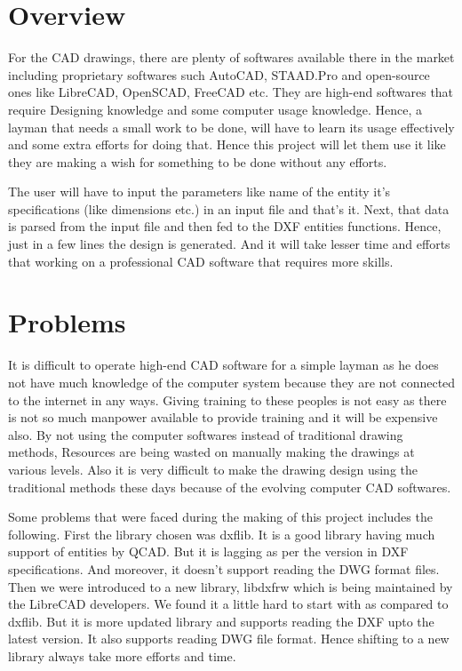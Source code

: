 \section{Overview}
For the CAD drawings, there are plenty of softwares available there in the market including proprietary softwares such AutoCAD, STAAD.Pro and open-source ones like LibreCAD, OpenSCAD, FreeCAD etc. They are high-end softwares that require Designing knowledge and some computer usage knowledge. Hence, a layman that needs a small work to be done, will have to learn its usage effectively and some extra efforts for doing that. Hence this project will let them use it like they are making a wish for something to be done without any efforts.


The user will have to input the parameters like name of the entity it's specifications (like dimensions etc.) in an input file and that's it. Next, that data is parsed from the input file and then fed to the DXF entities functions. Hence, just in a few lines the design is generated. And it will take lesser time and efforts that working on a professional CAD software that requires more skills.



\section{Problems}
It is difficult to operate high-end CAD software for a simple layman as he does not have  much knowledge of the computer system because they are not connected to the internet in any ways. Giving training to these peoples is not easy as there is not so much manpower available to provide training and it will be expensive also. By not using the computer softwares instead of traditional drawing methods, Resources are being wasted 
on manually making the drawings at various levels.
Also it is very difficult to make the drawing design using the traditional methods these days because of the evolving computer CAD softwares.

Some problems that were faced during the making of this project includes the following. First the library chosen was dxflib. It is a good library having much support of entities by QCAD. But it is lagging as per the version in DXF specifications. And moreover, it doesn't support reading the DWG format files. Then we were introduced to a new library, libdxfrw which is being maintained by the LibreCAD developers. We found it a little hard to start with as compared to dxflib. But it is more updated library and supports reading the DXF upto the latest version. It also supports reading DWG file format. Hence shifting to a new library always take more efforts and time.

